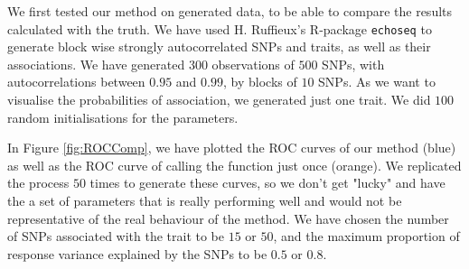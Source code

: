 \documentclass{article}
\numberwithin{equation}{section}
\begin{document}
We first tested our method on generated data, to be able to compare the results calculated with the truth. We have used H. Ruffieux's R-package \texttt{echoseq} to generate block wise strongly autocorrelated SNPs and traits, as well as their associations. We have generated $300$ observations of $500$ SNPs, with autocorrelations between $0.95$ and $0.99$, by blocks of $10$ SNPs. As we want to visualise the probabilities of association, we generated just one trait. We did $100$ random initialisations for the parameters.

In Figure \ref{fig:ROCComp}, we have plotted the ROC curves of our method (blue) as well as the ROC curve of calling the function just once (orange). We replicated the process $50$ times to generate these curves, so we don't get "lucky" and have the a set of parameters that is really performing well and would not be representative of the real behaviour of the method. We have chosen the number of SNPs associated with the trait to be $15$ or $50$, and the maximum proportion of response variance explained by the SNPs to be $0.5$ or $0.8$.
\end{document}
